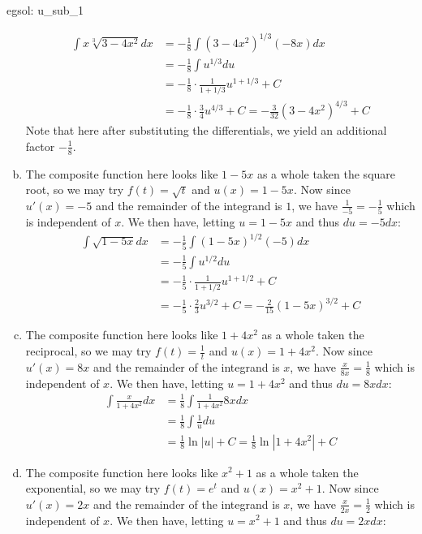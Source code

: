 \begin{egsol}[]{egsol: u_sub_1}
\begin{enumerate}[a)]
        \begin{align*}
            \int x\sqrt[3]{3-4x^2} dx &= -\frac{1}{8}\int (3-4x^2)^{1/3} (-8x)dx\\
            &= -\frac{1}{8}\int u^{1/3} du\\
            &= -\frac{1}{8}\cdot\frac{1}{1+1/3}u^{1+1/3} + C \\
            &= -\frac{1}{8}\cdot\frac{3}{4}u^{4/3} + C = -\frac{3}{32}(3-4x^2)^{4/3} + C
        \end{align*}
        Note that here after substituting the differentials, we yield an additional factor $-\frac{1}{8}$.
        \item The composite function here looks like $1-5x$ as a whole taken the square root, so we may try $f(t) = \sqrt{t}$ and $u(x) = 1-5x$.  Now since $u'(x) = -5$ and the remainder of the integrand is $1$, we have $\frac{1}{-5} = -\frac{1}{5}$ which is independent of $x$.  We then have, letting $u = 1-5x$ and thus $du = -5dx$:
        \begin{align*}
            \int \sqrt{1-5x} dx &= -\frac{1}{5}\int (1-5x)^{1/2} (-5)dx\\
            &= -\frac{1}{5}\int u^{1/2} du\\
            &= -\frac{1}{5}\cdot\frac{1}{1+1/2}u^{1+1/2} + C \\
            &= -\frac{1}{5}\cdot\frac{2}{3}u^{3/2} + C = -\frac{2}{15}(1-5x)^{3/2} + C
        \end{align*}
        \item The composite function here looks like $1+4x^2$ as a whole taken the reciprocal, so we may try $f(t) = \frac{1}{t}$ and $u(x) = 1+4x^2$.  Now since $u'(x) = 8x$ and the remainder of the integrand is $x$, we have $\frac{x}{8x} = \frac{1}{8}$ which is independent of $x$.  We then have, letting $u = 1+4x^2$ and thus $du = 8xdx$:
        \begin{align*}
            \int \frac{x}{1+4x^2} dx &= \frac{1}{8}\int  \frac{1}{1+4x^2} 8xdx\\
            &= \frac{1}{8}\int \frac{1}{u} du\\
            &= \frac{1}{8}\ln |u| + C = \frac{1}{8} \ln |1+4x^2| + C
        \end{align*}
        \item The composite function here looks like $x^2+1$ as a whole taken the exponential, so we may try $f(t) = e^t$ and $u(x) = x^2+1$.  Now since $u'(x) = 2x$ and the remainder of the integrand is $x$, we have $\frac{x}{2x} = \frac{1}{2}$ which is independent of $x$.  We then have, letting $u = x^2 + 1$ and thus $du = 2xdx$:

\end{enumerate}
\end{egsol}
